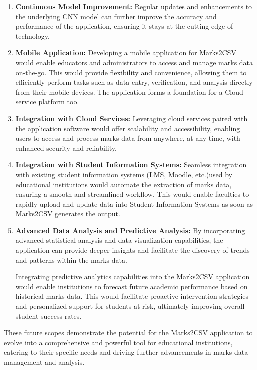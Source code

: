 \begin{enumerate}

\item \textbf{Continuous Model Improvement:}  Regular updates and enhancements to the underlying CNN model can further improve the accuracy and performance of the application, ensuring it stays at the cutting edge of technology.

\item \textbf{Mobile Application:}  Developing a mobile application for Marks2CSV would enable educators and administrators to access and manage marks data on-the-go. This would provide flexibility and convenience, allowing them to efficiently perform tasks such as data entry, verification, and analysis directly from their mobile devices. The application forms a foundation for a Cloud service platform too. 

\item \textbf{Integration with Cloud Services:} Leveraging cloud services paired with the application software would offer scalability and accessibility, enabling users to access and process marks data from anywhere, at any time, with enhanced security and reliability. 

\item \textbf{Integration with Student Information Systems:} Seamless integration with existing student information systems (LMS, Moodle, etc.)used by educational institutions would automate the extraction of marks data, ensuring a smooth and streamlined workflow. This would enable faculties to rapidly upload and update data into Student Information Systems  as soon as Marks2CSV generates the output.

\item \textbf{Advanced Data Analysis and Predictive Analysis:} By incorporating advanced statistical analysis and data visualization capabilities, the application can provide deeper insights and facilitate the discovery of trends and patterns within the marks data. 

Integrating predictive analytics capabilities into the Marks2CSV application would enable institutions to forecast future academic performance based on historical marks data. This would facilitate proactive intervention strategies and personalized support for students at risk, ultimately improving overall student success rates.

\end{enumerate}
These future scopes demonstrate the potential for the Marks2CSV application to evolve into a comprehensive and powerful tool for educational institutions, catering to their specific needs and driving further advancements in marks data management and analysis.

